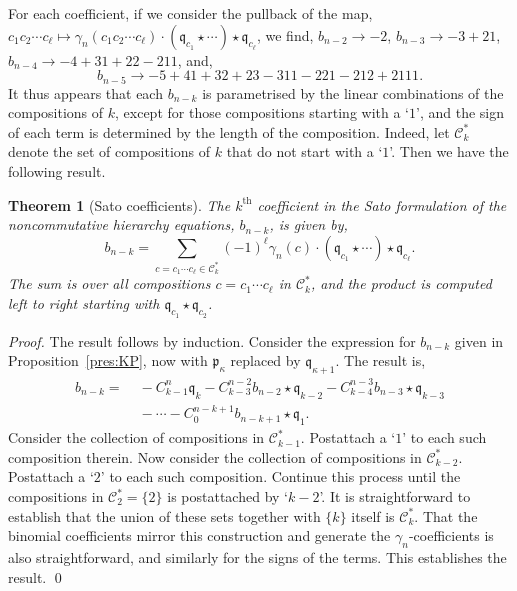 \documentclass[5p,twocolumn]{elsarticle}
\newcommand*{\pf}{\mathfrak p}
\newcommand*{\qf}{\mathfrak q}
\newtheorem{theorem}{Theorem}
\begin{document}
For each coefficient, if we consider the pullback of the map, $c_1c_2\cdots c_\ell\mapsto \gamma_n(c_1c_2\cdots c_\ell)\cdot(\qf_{c_1}\star\cdots)\star\qf_{c_\ell}$,
we find, $b_{n-2}\to-2$, $ b_{n-3}\to-3+21$, $b_{n-4}\to-4+31+22-211$, and,
\begin{equation*}
b_{n-5}\to-5+41+32+23-311-221-212+2111. 
\end{equation*}
It thus appears that each $b_{n-k}$ is parametrised by the linear combinations of the compositions of $k$, except for those compositions starting with a `$1$',
and the sign of each term is determined by the length of the composition.
Indeed, let $\mathcal C_k^\ast$ denote the set of compositions of $k$ that do not start with a `$1$'. Then we have the following result.
%
\begin{theorem}[Sato coefficients]\label{thm:Satocoeffs}
  The $k^{\mathrm{th}}$ coefficient in the Sato formulation of the noncommutative hierarchy equations, $b_{n-k}$, is given by,
\begin{equation*}
   b_{n-k}=\sum_{c=c_1\cdots c_\ell\in\mathcal C_k^\ast}(-1)^{\ell} \gamma_n(c)\cdot(\qf_{c_1}\star\cdots)\star\qf_{c_\ell}.
\end{equation*}
The sum is over all compositions $c=c_1\cdots c_\ell$ in $\mathcal C_k^\ast$, and the product is computed left to right starting with $\qf_{c_1}\star\qf_{c_2}$.
\end{theorem}
%
\begin{proof}
The result follows by induction. Consider the expression for $b_{n-k}$ given in Proposition~\ref{pres:KP}, now with $\pf_\kappa$ replaced by $\qf_{\kappa+1}$. 
The result is,
\begin{align*}
  b_{n-k}=&\;-C^n_{k-1}\qf_{k}-C^{n-2}_{k-3}b_{n-2}\star\qf_{k-2}-C^{n-3}_{k-4}b_{n-3}\star\qf_{k-3}\\
         &\;-\cdots-C_0^{n-k+1}b_{n-k+1}\star\qf_1.
\end{align*}
Consider the collection of compositions in $\mathcal C^\ast_{k-1}$. Postattach a `$1$' to each such composition therein. 
Now consider the collection of compositions in $\mathcal C^\ast_{k-2}$. Postattach a `$2$' to each such composition. 
Continue this process until the compositions in $\mathcal C^\ast_{2}=\{2\}$ is postattached by `$k-2$'.  
It is straightforward to establish that the union of these sets together with $\{k\}$ itself is $\mathcal C^\ast_{k}$.
That the binomial coefficients mirror this construction and generate the $\gamma_n$-coefficients is also straightforward, and similarly for the signs of the terms.
This establishes the result.
\qed
\end{proof}
\end{document}
